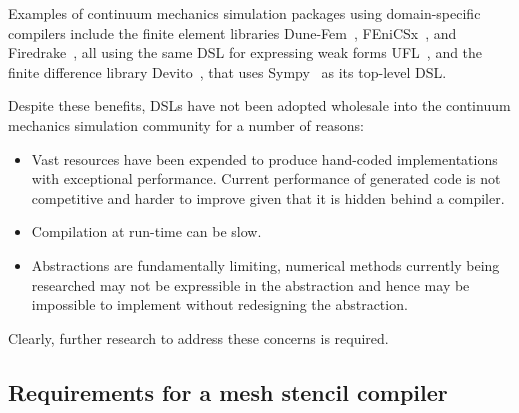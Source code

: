 \documentclass[thesis]{subfiles}
\begin{document}
Examples of continuum mechanics simulation packages using domain-specific compilers include the finite element libraries Dune-Fem~\cite{dednerGenericInterfaceParallel2010}, FEniCSx~\cite{barattaDOLFINxNextGeneration2023}, and Firedrake~\cite{FiredrakeUserManual}, all using the same DSL for expressing weak forms UFL~\cite{alnaesUnifiedFormLanguage2014a}, and the finite difference library Devito~\cite{devito-api,luporiniArchitecturePerformanceDevito2020}, that uses Sympy~\cite{10.7717/peerj-cs.103} as its top-level DSL.

Despite these benefits, DSLs have not been adopted wholesale into the continuum mechanics simulation community for a number of reasons:

\begin{itemize}
  \item
    Vast resources have been expended to produce hand-coded implementations with exceptional performance.
    Current performance of generated code is not competitive and harder to improve given that it is hidden behind a compiler.
  \item
    Compilation at run-time can be slow.
  \item
    Abstractions are fundamentally limiting, numerical methods currently being researched may not be expressible in the abstraction and hence may be impossible to implement without redesigning the abstraction.
\end{itemize}

Clearly, further research to address these concerns is required.


\subsection{Requirements for a mesh stencil compiler}

\end{document}
